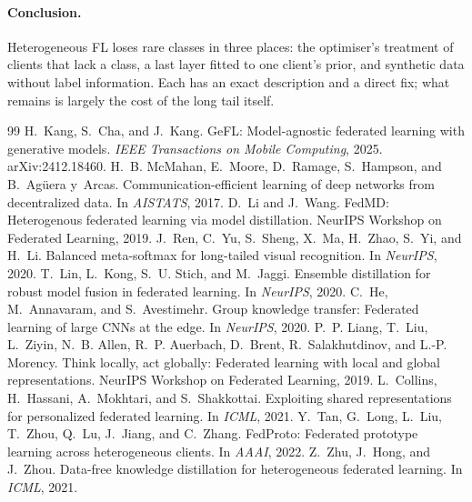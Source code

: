\documentclass[10pt]{article}
\theoremstyle{plain}
\theoremstyle{definition}
\begin{document}
\paragraph{Conclusion.} Heterogeneous FL loses rare classes in three places: the optimiser's treatment of clients
that lack a class, a last layer fitted to one client's prior, and synthetic data without label information. Each has an
exact description and a direct fix; what remains is largely the cost of the long tail itself.

\small

\begin{thebibliography}{99}
 H.~Kang, S.~Cha, and J.~Kang. GeFL: Model-agnostic federated learning with generative models. \emph{IEEE Transactions on Mobile Computing}, 2025. arXiv:2412.18460.
 H.~B. McMahan, E.~Moore, D.~Ramage, S.~Hampson, and B.~Ag\"uera y~Arcas. Communication-efficient learning of deep networks from decentralized data. In \emph{AISTATS}, 2017.
 D.~Li and J.~Wang. FedMD: Heterogenous federated learning via model distillation. NeurIPS Workshop on Federated Learning, 2019.
 J.~Ren, C.~Yu, S.~Sheng, X.~Ma, H.~Zhao, S.~Yi, and H.~Li. Balanced meta-softmax for long-tailed visual recognition. In \emph{NeurIPS}, 2020.
 T.~Lin, L.~Kong, S.~U. Stich, and M.~Jaggi. Ensemble distillation for robust model fusion in federated learning. In \emph{NeurIPS}, 2020.
 C.~He, M.~Annavaram, and S.~Avestimehr. Group knowledge transfer: Federated learning of large CNNs at the edge. In \emph{NeurIPS}, 2020.
 P.~P. Liang, T.~Liu, L.~Ziyin, N.~B. Allen, R.~P. Auerbach, D.~Brent, R.~Salakhutdinov, and L.-P. Morency. Think locally, act globally: Federated learning with local and global representations. NeurIPS Workshop on Federated Learning, 2019.
 L.~Collins, H.~Hassani, A.~Mokhtari, and S.~Shakkottai. Exploiting shared representations for personalized federated learning. In \emph{ICML}, 2021.
 Y.~Tan, G.~Long, L.~Liu, T.~Zhou, Q.~Lu, J.~Jiang, and C.~Zhang. FedProto: Federated prototype learning across heterogeneous clients. In \emph{AAAI}, 2022.
 Z.~Zhu, J.~Hong, and J.~Zhou. Data-free knowledge distillation for heterogeneous federated learning. In \emph{ICML}, 2021.

\end{thebibliography}
\end{document}
